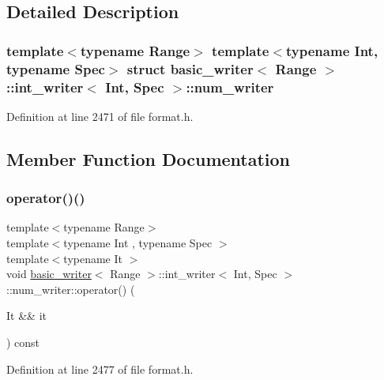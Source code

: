 \subsection{Detailed Description}
\subsubsection*{template$<$typename Range$>$\newline
template$<$typename Int, typename Spec$>$\newline
struct basic\+\_\+writer$<$ Range $>$\+::int\+\_\+writer$<$ Int, Spec $>$\+::num\+\_\+writer}



Definition at line 2471 of file format.\+h.



\subsection{Member Function Documentation}
\mbox{\label{structbasic__writer_1_1int__writer_1_1num__writer_ac7c7665860b61c4d74911ec04ab2289e}} 
\subsubsection{\texorpdfstring{operator()()}{operator()()}}
{\footnotesize\ttfamily template$<$typename Range$>$ \\
template$<$typename Int , typename Spec $>$ \\
template$<$typename It $>$ \\
void \hyperlink{classbasic__writer}{basic\+\_\+writer}$<$ Range $>$\+::int\+\_\+writer$<$ Int, Spec $>$\+::num\+\_\+writer\+::operator() (\begin{DoxyParamCaption}\item[{It \&\&}]{it }\end{DoxyParamCaption}) const\hspace{0.3cm}{\ttfamily [inline]}}



Definition at line 2477 of file format.\+h.



